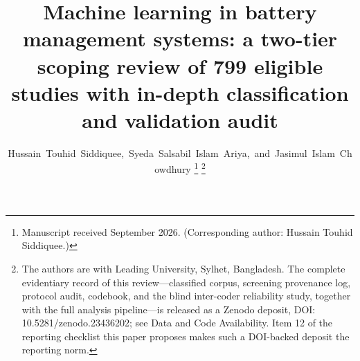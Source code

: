 \documentclass[journal]{IEEEtran}
\begin{document}
\title{Machine learning in battery management systems: a two-tier scoping review of 799 eligible studies with in-depth classification and validation audit}

\author{Hussain~Touhid~Siddiquee,~Syeda~Salsabil~Islam~Ariya,~and~Jasimul~Islam~Chowdhury%
\thanks{Manuscript received September 2026. (Corresponding author: Hussain Touhid Siddiquee.)}%
\thanks{The authors are with Leading University, Sylhet, Bangladesh. The complete evidentiary
record of this review---classified corpus, screening provenance log, protocol audit, codebook,
and the blind inter-coder reliability study, together with the full analysis pipeline---is
released as a Zenodo deposit, DOI: 10.5281/zenodo.23436202; see Data and Code
Availability. Item 12 of the reporting checklist this paper proposes makes such a DOI-backed
deposit the reporting norm.}}


\maketitle
\end{document}
